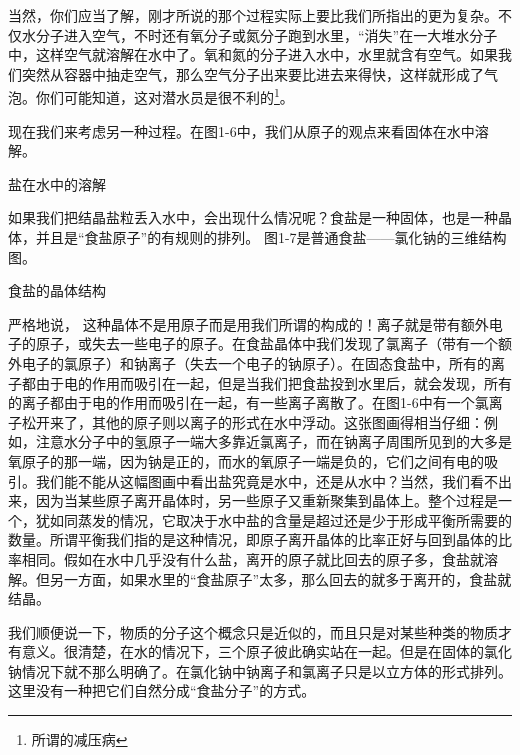 \documentclass[12pt,oneside]{book}
\begin{document}
\begin{common-format}
当然，你们应当了解，刚才所说的那个过程实际上要比我们所指出的更为复杂。不仅水分子进入空气，不时还有氧分子或氮分子跑到水里，“消失”在一大堆水分子中，这样空气就溶解在水中了。氧和氮的分子进入水中，水里就含有空气。如果我们突然从容器中抽走空气，那么空气分子出来要比进去来得快，这样就形成了气泡。你们可能知道，这对潜水员是很不利的\footnote{所谓的减压病}。

现在我们来考虑另一种过程。在图1-6中，我们从原子的观点来看固体在水中溶解。
\begin{fig}{盐在水中的溶解}
\caption{盐在水中的溶解}
\label{fig:盐在水中的溶解}
\end{fig}
如果我们把结晶盐粒丢入水中，会出现什么情况呢？食盐是一种固体，也是一种晶体，并且是“食盐原子”的有规则的排列。
图1-7是普通食盐——氯化钠的三维结构图。
\begin{fig}{食盐的晶体结构}
\caption{食盐的晶体结构}
\label{fig:食盐的晶体结构}
\end{fig}
严格地说， 这种晶体不是用原子而是用我们所谓的构成的！离子就是带有额外电子的原子，或失去一些电子的原子。在食盐晶体中我们发现了氯离子（带有一个额外电子的氯原子）和钠离子（失去一个电子的钠原子）。在固态食盐中，所有的离子都由于电的作用而吸引在一起，但是当我们把食盐投到水里后，就会发现，所有的离子都由于电的作用而吸引在一起，有一些离子离散了。在图1-6中有一个氯离子松开来了，其他的原子则以离子的形式在水中浮动。这张图画得相当仔细：例如，注意水分子中的氢原子一端大多靠近氯离子，而在钠离子周围所见到的大多是氧原子的那一端，因为钠是正的，而水的氧原子一端是负的，它们之间有电的吸引。我们能不能从这幅图画中看出盐究竟是水中，还是从水中？当然，我们看不出来，因为当某些原子离开晶体时，另一些原子又重新聚集到晶体上。整个过程是一个，犹如同蒸发的情况，它取决于水中盐的含量是超过还是少于形成平衡所需要的数量。所谓平衡我们指的是这种情况，即原子离开晶体的比率正好与回到晶体的比率相同。假如在水中几乎没有什么盐，离开的原子就比回去的原子多，食盐就溶解。但另一方面，如果水里的“食盐原子”太多，那么回去的就多于离开的，食盐就结晶。

我们顺便说一下，物质的分子这个概念只是近似的，而且只是对某些种类的物质才有意义。很清楚，在水的情况下，三个原子彼此确实站在一起。但是在固体的氯化钠情况下就不那么明确了。在氯化钠中钠离子和氯离子只是以立方体的形式排列。这里没有一种把它们自然分成“食盐分子”的方式。


\end{common-format}
\end{document}
